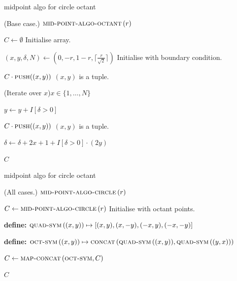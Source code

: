 \documentclass[aspectratio=169,xcolor={dvipsnames,svgnames}]{beamer}
\begin{document}
\begin{frame}[label={sec:orgfbb800b}]{midpoint algo for circle octant}
\begin{algorithm}[H]
  \caption{Mid-Point Algorithm for Circle Octant}
  \DontPrintSemicolon

  \Fn(\hfill {\scriptsize Base case.}){\upshape
    $\textsc{mid-point-algo-octant}\, (r)$}{


    $C\gets\emptyset$ \hfill {\scriptsize Initialise
      array.}

    $(x,y,\delta,N) \gets (0, -r, 1-r, \lceil
    \frac{r}{\sqrt{2}} \rceil)$ \hfill {\scriptsize
      Initialise with boundary condition.}

    $C\cdot\textsc{push}((x,y))$\hfill {\scriptsize
      $(x,y)$ is a tuple.}

    \For(\hfill{\scriptsize Iterate over
      $x$}){$x\in\{1,\ldots,N\}$}{

      $y\gets y+I[\delta>0]$

      $C\cdot\textsc{push}((x,y))$\hfill {\scriptsize
        $(x,y)$ is a tuple.}

      $\delta \gets \delta + 2x + 1 +
      I[\delta>0]\cdot(2y)$

    }

    \Return $C$

  }
\end{algorithm}
\end{frame}

\begin{frame}[label={sec:org04a7749}]{midpoint algo for circle octant}
\begin{algorithm}[H]
  \caption{Mid-Point Algorithm for Circle}
  \DontPrintSemicolon

  \Fn(\hfill {\scriptsize All cases.}){\upshape
    $\textsc{mid-point-algo-circle}\, (r)$}{


    $C\gets\textsc{mid-point-algo-circle}\, (r)$ \hfill
    {\scriptsize Initialise with octant points.}

    \textbf{define:} $\textsc{quad-sym}\,((x,y))
    \mapsto [(x,y),(x,-y),(-x,y),(-x,-y)]$

    \textbf{define:}
    $\textsc{oct-sym}\,((x,y)) \mapsto
    \textsc{concat}\, (\textsc{quad-sym}\,((x,y)),
    \textsc{quad-sym}\,((y,x)))$

    $C\gets \textsc{map-concat}\,(\textsc{oct-sym}, C)$

    \Return $C$

  }
\end{algorithm}
\end{frame}
\end{document}
